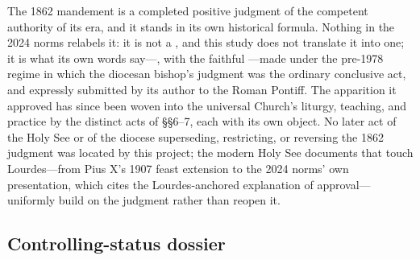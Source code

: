The 1862 mandement is a completed positive judgment of the
competent authority of its era, and it stands in its own
historical formula. Nothing in the 2024 norms relabels it: it is
not a , and this study does not translate it
into one; it is what its own words say---, with the
faithful ---made under the
pre-1978 regime in which the diocesan bishop's judgment was the
ordinary conclusive act, and expressly submitted by its author
to the Roman Pontiff. The apparition it approved has since been
woven into the universal Church's liturgy, teaching, and
practice by the distinct acts of \S\S6--7, each with its own
object. No later act of the Holy See or of the diocese
superseding, restricting, or reversing the 1862 judgment was
located by this project; the modern Holy See documents that
touch Lourdes---from Pius X's 1907 feast extension to the 2024
norms' own presentation, which cites the Lourdes-anchored
explanation of approval---uniformly build on the judgment rather
than reopen it.

\subsection{Controlling-status dossier}

